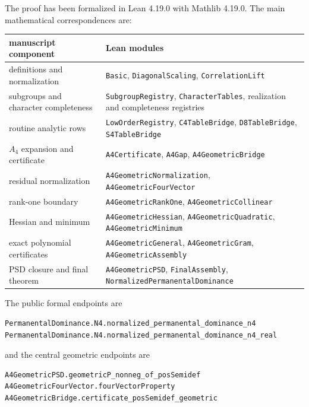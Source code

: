 \documentclass[11pt]{article}
\theoremstyle{definition}
\begin{document}
The proof has been formalized in Lean 4.19.0 with Mathlib 4.19.0.  The main
mathematical correspondences are:
\begin{center}
\begin{tabular}{@{}p{}p{}@{}}
\toprule
manuscript component & Lean modules\\
\midrule
definitions and normalization & \texttt{Basic}, \texttt{DiagonalScaling},
\texttt{CorrelationLift}\\
subgroups and character completeness & \texttt{SubgroupRegistry},
\texttt{CharacterTables}, realization and completeness registries\\
routine analytic rows & \texttt{LowOrderRegistry}, \texttt{C4TableBridge},
\texttt{D8TableBridge}, \texttt{S4TableBridge}\\
$A_4$ expansion and certificate & \texttt{A4Certificate}, \texttt{A4Gap},
\texttt{A4GeometricBridge}\\
residual normalization & \texttt{A4GeometricNormalization},
\texttt{A4GeometricFourVector}\\
rank-one boundary & \texttt{A4GeometricRankOne},
\texttt{A4GeometricCollinear}\\
Hessian and minimum & \texttt{A4GeometricHessian},
\texttt{A4GeometricQuadratic}, \texttt{A4GeometricMinimum}\\
exact polynomial certificates & \texttt{A4GeometricGeneral},
\texttt{A4GeometricGram}, \texttt{A4GeometricAssembly}\\
PSD closure and final theorem & \texttt{A4GeometricPSD},
\texttt{FinalAssembly}, \texttt{NormalizedPermanentalDominance}\\
\bottomrule
\end{tabular}
\end{center}

The public formal endpoints are
\begin{verbatim}
PermanentalDominance.N4.normalized_permanental_dominance_n4
PermanentalDominance.N4.normalized_permanental_dominance_n4_real
\end{verbatim}
and the central geometric endpoints are
\begin{verbatim}
A4GeometricPSD.geometricP_nonneg_of_posSemidef
A4GeometricFourVector.fourVectorProperty
A4GeometricBridge.certificate_posSemidef_geometric
\end{verbatim}
\end{document}
